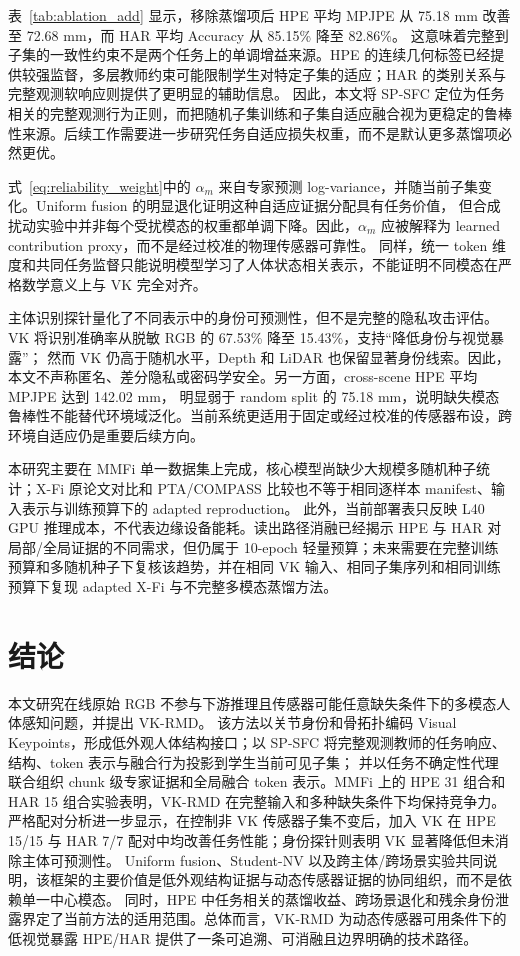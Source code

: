 \documentclass[journal]{IEEEtran}
\newcommand{\parahead}[1]{\vspace{0.4em}\noindent{\textbf{#1}}}
\begin{document}
\parahead{SP-SFC 的任务相关性。}
表~\ref{tab:ablation_add} 显示，移除蒸馏项后 HPE 平均 MPJPE 从 75.18 mm 改善至 72.68 mm，而 HAR 平均 Accuracy 从 85.15\% 降至 82.86\%。
这意味着完整到子集的一致性约束不是两个任务上的单调增益来源。HPE 的连续几何标签已经提供较强监督，多层教师约束可能限制学生对特定子集的适应；HAR 的类别关系与完整观测软响应则提供了更明显的辅助信息。
因此，本文将 SP-SFC 定位为任务相关的完整观测行为正则，而把随机子集训练和子集自适应融合视为更稳定的鲁棒性来源。后续工作需要进一步研究任务自适应损失权重，而不是默认更多蒸馏项必然更优。

\parahead{贡献权重的解释。}
式~\eqref{eq:reliability_weight}中的 $\alpha_m$ 来自专家预测 log-variance，并随当前子集变化。Uniform fusion 的明显退化证明这种自适应证据分配具有任务价值，
但合成扰动实验中并非每个受扰模态的权重都单调下降。因此，$\alpha_m$ 应被解释为 learned contribution proxy，而不是经过校准的物理传感器可靠性。
同样，统一 token 维度和共同任务监督只能说明模型学习了人体状态相关表示，不能证明不同模态在严格数学意义上与 VK 完全对齐。

\parahead{隐私与部署边界。}
主体识别探针量化了不同表示中的身份可预测性，但不是完整的隐私攻击评估。VK 将识别准确率从脱敏 RGB 的 67.53\% 降至 15.43\%，支持“降低身份与视觉暴露”；
然而 VK 仍高于随机水平，Depth 和 LiDAR 也保留显著身份线索。因此，本文不声称匿名、差分隐私或密码学安全。另一方面，cross-scene HPE 平均 MPJPE 达到 142.02 mm，
明显弱于 random split 的 75.18 mm，说明缺失模态鲁棒性不能替代环境域泛化。当前系统更适用于固定或经过校准的传感器布设，跨环境自适应仍是重要后续方向。

\parahead{实验限制。}
本研究主要在 MMFi 单一数据集上完成，核心模型尚缺少大规模多随机种子统计；X-Fi 原论文对比和 PTA/COMPASS 比较也不等于相同逐样本 manifest、输入表示与训练预算下的 adapted reproduction。
此外，当前部署表只反映 L40 GPU 推理成本，不代表边缘设备能耗。读出路径消融已经揭示 HPE 与 HAR 对局部/全局证据的不同需求，但仍属于 10-epoch 轻量预算；未来需要在完整训练预算和多随机种子下复核该趋势，并在相同 VK 输入、相同子集序列和相同训练预算下复现 adapted X-Fi 与不完整多模态蒸馏方法。

\section{结论}

本文研究在线原始 RGB 不参与下游推理且传感器可能任意缺失条件下的多模态人体感知问题，并提出 VK-RMD。
该方法以关节身份和骨拓扑编码 Visual Keypoints，形成低外观人体结构接口；以 SP-SFC 将完整观测教师的任务响应、结构、token 表示与融合行为投影到学生当前可见子集；
并以任务不确定性代理联合组织 chunk 级专家证据和全局融合 token 表示。MMFi 上的 HPE 31 组合和 HAR 15 组合实验表明，VK-RMD 在完整输入和多种缺失条件下均保持竞争力。
严格配对分析进一步显示，在控制非 VK 传感器子集不变后，加入 VK 在 HPE 15/15 与 HAR 7/7 配对中均改善任务性能；身份探针则表明 VK 显著降低但未消除主体可预测性。
Uniform fusion、Student-NV 以及跨主体/跨场景实验共同说明，该框架的主要价值是低外观结构证据与动态传感器证据的协同组织，而不是依赖单一中心模态。
同时，HPE 中任务相关的蒸馏收益、跨场景退化和残余身份泄露界定了当前方法的适用范围。总体而言，VK-RMD 为动态传感器可用条件下的低视觉暴露 HPE/HAR 提供了一条可追溯、可消融且边界明确的技术路径。
\end{document}

